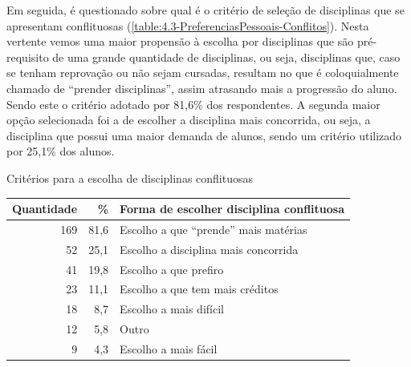 \begin{apendicesenv}
  Em seguida, é questionado sobre qual é o critério de seleção de disciplinas que se apresentam conflituosas (\autoref{table:4.3-PreferenciasPessoais-Conflitos}). Nesta vertente vemos uma maior propensão à escolha por disciplinas que são pré-requisito de uma grande quantidade de disciplinas, ou seja, disciplinas que, caso se tenham reprovação ou não sejam cursadas, resultam no que é coloquialmente chamado de ``prender disciplinas'', assim atrasando mais a progressão do aluno. Sendo este o critério adotado por 81,6\% dos respondentes. A segunda maior opção selecionada foi a de escolher a disciplina mais concorrida, ou seja, a disciplina que possui uma maior demanda de alunos, sendo um critério utilizado por 25,1\% dos alunos.


  \begin{CenteredTable} \caption{Critérios para a escolha de disciplinas conflituosas} \label{table:4.3-PreferenciasPessoais-Conflitos}
    \begin{tabular}{| r r l |}
      \hline
      \textbf{Quantidade} & \%   & \textbf{Forma de escolher disciplina conflituosa} \\
      \hline
      169                 & 81,6 & Escolho a que ``prende'' mais matérias            \\
      52                  & 25,1 & Escolho a disciplina mais concorrida              \\
      41                  & 19,8 & Escolho a que prefiro                             \\
      23                  & 11,1 & Escolho a que tem mais créditos                   \\
      18                  & 8,7  & Escolho a mais difícil                            \\
      12                  & 5,8  & Outro                                             \\
      9                   & 4,3  & Escolho a mais fácil                              \\
      \hline
    \end{tabular}
  \end{CenteredTable}


\end{apendicesenv}
